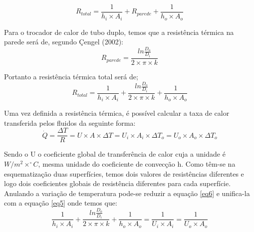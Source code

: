\documentclass[a4paper,12pt,oneside]{article}
\begin{document}
\begin{flushright}
\begin{equation}\label{eq3}
R_{total} = \frac{1}{h_{i} \times A_{i}} + R_{parede} + \frac{1}{h_{o} \times A_{o}}
\end{equation}
\vspace{0.5cm}

Para o trocador de calor de tubo duplo, temos que a resistência térmica na parede será de, segundo Çengel (2002):\\

\begin{equation}\label{eq4}
R_{parede} = \frac{ln \frac{D_{o}}{D_{i}}}{2 \times \pi \times k}
\end{equation}
\vspace{0.5cm}

Portanto a resistência térmica total será de;\\

\begin{equation}\label{eq5}
R_{total} = \frac{1}{h_{i} \times A_{i}} + \frac{ln \frac{D_{o}}{D_{i}}}{2 \times \pi \times k} + \frac{1}{h_{o} \times A_{o}}
\end{equation}
\vspace{0.5cm}

Uma vez definida a resistência térmica, é possível calcular a taxa de calor transferida pelos fluidos da seguinte forma:\\

\begin{equation}\label{eq6}
\dot{Q} = \frac{\Delta T}{R} = U \times A \times \Delta T = U_{i} \times A_{i} \times \Delta T_{o} = U_{o} \times A_{o} \times \Delta T_{o}
\end{equation}
\vspace{0.5cm}

Sendo o U o coeficiente global de transferência de calor cuja a unidade é $W/m^2\times ^\circ C$, mesma unidade do coeficiente de convecção h. Como têm-se na esquematização duas superfícies, temos dois valores de resistências diferentes e logo dois coeficientes globais de resistência diferentes para cada superfície. Anulando a variação de temperatura pode-se reduzir a equação \ref{eq6} e unifica-la com a equação \ref{eq5} onde temos que:\\


\begin{equation}\label{eq7}
\frac{1}{h_{i} \times A_{i}} + \frac{ln \frac{D_{o}}{D_{i}}}{2 \times \pi \times k} + \frac{1}{h_{o} \times A_{o}} = \frac{1}{U_{i} \times A_{i}} = \frac{1}{U_{o} \times A_{o}}
\end{equation}
\vspace{0.5cm}


\end{flushright}
\end{document}
